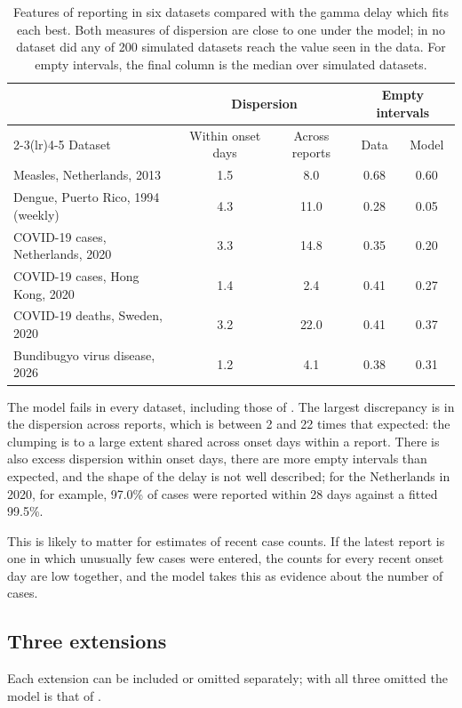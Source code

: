 \documentclass[11pt,a4paper]{article}
\begin{document}
\begin{table}[h]
\centering
\begin{tabular}{lcccc}
\toprule
 & \multicolumn{2}{c}{Dispersion} & \multicolumn{2}{c}{Empty intervals} \\
\cmidrule(lr){2-3}\cmidrule(lr){4-5}
Dataset & Within onset days & Across reports & Data & Model \\
\midrule
Measles, Netherlands, 2013 & 1.5 & 8.0 & 0.68 & 0.60 \\
Dengue, Puerto Rico, 1994 (weekly) & 4.3 & 11.0 & 0.28 & 0.05 \\
COVID-19 cases, Netherlands, 2020 & 3.3 & 14.8 & 0.35 & 0.20 \\
COVID-19 cases, Hong Kong, 2020 & 1.4 & 2.4 & 0.41 & 0.27 \\
COVID-19 deaths, Sweden, 2020 & 3.2 & 22.0 & 0.41 & 0.37 \\
Bundibugyo virus disease, 2026 & 1.2 & 4.1 & 0.38 & 0.31 \\
\bottomrule
\end{tabular}
\caption{Features of reporting in six datasets compared with the gamma delay
which fits each best. Both measures of dispersion are close to one under the
model; in no dataset did any of 200 simulated datasets reach the value seen in
the data. For empty intervals, the final column is the median over simulated
datasets.}
\label{tab:reportingchecks}
\end{table}

The model fails in every dataset, including those of \cite{bajaj2025}. The
largest discrepancy is in the dispersion across reports, which is between 2
and 22 times that expected: the clumping is to a large extent shared across
onset days within a report. There is also excess dispersion within onset days,
there are more empty intervals than expected, and the shape of the delay is
not well described; for the Netherlands in 2020, for example, 97.0\% of cases
were reported within 28 days against a fitted 99.5\%.

This is likely to matter for estimates of recent case counts. If the latest
report is one in which unusually few cases were entered, the counts for every
recent onset day are low together, and the model takes this as evidence about
the number of cases.

\subsection{Three extensions}

Each extension can be included or omitted separately; with all three omitted
the model is that of \cite{bajaj2025}.
\end{document}
